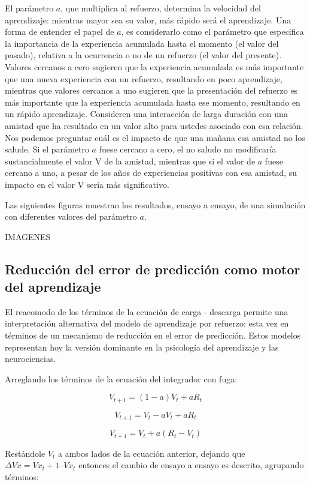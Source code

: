 \documentclass[
  letterpaper,
]{book}
\begin{document}
El parámetro \(a\), que multiplica al refuerzo, determina la velocidad
del aprendizaje: mientras mayor sea su valor, más rápido será el
aprendizaje. Una forma de entender el papel de \(a\), es considerarlo
como el parámetro que especifica la importancia de la experiencia
acumulada hasta el momento (el valor del pasado), relativa a la
ocurrencia o no de un refuerzo (el valor del presente). Valores cercanos
a cero sugieren que la experiencia acumulada es más importante que una
nueva experiencia con un refuerzo, resultando en poco aprendizaje,
mientras que valores cercanos a uno sugieren que la presentación del
refuerzo es más importante que la experiencia acumulada hasta ese
momento, resultando en un rápido aprendizaje. Consideren una interacción
de larga duración con una amistad que ha resultado en un valor alto para
ustedes asociado con esa relación. Nos podemos preguntar cuál es el
impacto de que una mañana esa amistad no los salude. Si el parámetro
\(a\) fuese cercano a cero, el no saludo no modificaría sustancialmente
el valor V de la amistad, mientras que si el valor de \(a\) fuese
cercano a uno, a pesar de los años de experiencias positivas con esa
amistad, su impacto en el valor V sería más significativo.

Las siguientes figuras muestran los resultados, ensayo a ensayo, de una
simulación con diferentes valores del parámetro \(a\).

IMAGENES

\subsection{Reducción del error de predicción como motor del
aprendizaje}\label{reducciuxf3n-del-error-de-predicciuxf3n-como-motor-del-aprendizaje}

El reacomodo de los términos de la ecuación de carga - descarga permite
una interpretación alternativa del modelo de aprendizaje por refuerzo:
esta vez en términos de un mecanismo de reducción en el error de
predicción. Estos modelos representan hoy la versión dominante en la
psicología del aprendizaje y las neurociencias.

Arreglando los términos de la ecuación del integrador con fuga:

\[
V_{t+1} = (1-a)V_t + aR_t
\]

\[
V_{t+1} = V_t - aV_t + aR_t
\]

\[
V_{t+1} = V_t + a (R_t -V_t)
\]

Restándole \(V_t\) a ambos lados de la ecuación anterior, dejando que
\(\Delta Vx = Vx_t+1 – Vx_t\) entonces el cambio de ensayo a ensayo es
descrito, agrupando términos:
\end{document}
